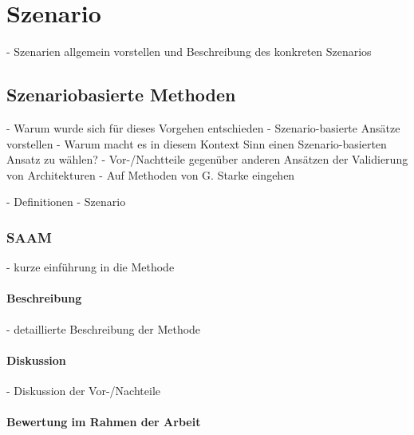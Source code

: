 
\chapter{Szenario} %
\label{cha:szenario}

  - Szenarien allgemein vorstellen und Beschreibung des konkreten Szenarios
  
\section{Szenariobasierte Methoden} %
\label{sec:szenariobasierte_methoden}
  
- Warum wurde sich für dieses Vorgehen entschieden
- Szenario-basierte Ansätze vorstellen
- Warum macht es in diesem Kontext Sinn einen Szenario-basierten Ansatz zu wählen?
- Vor-/Nachtteile gegenüber anderen Ansätzen der Validierung von Architekturen
- Auf Methoden von G. Starke eingehen

- Definitionen
  - Szenario

\subsection{SAAM} %
\label{sub:saam}

 - kurze einführung in die Methode

\subsubsection{Beschreibung} %
\label{ssub:beschreibung}

  - detaillierte Beschreibung der Methode


\subsubsection{Diskussion} %
\label{ssub:diskussion}

 - Diskussion der Vor-/Nachteile


\subsubsection{Bewertung im Rahmen der Arbeit} %
\label{ssub:bewertung_im_rahmen_der_arbeit}


